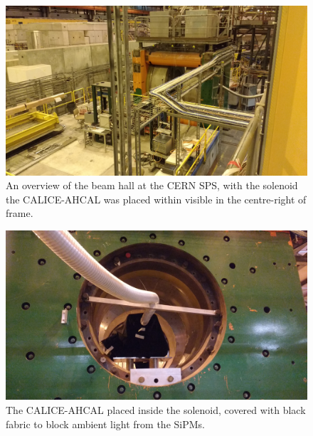 \begin{figure}[p]
	\centering
	\includegraphics[width=1\textwidth]{../Pictures/AHCAL-CERN-2017-Area-1.jpg}
	\caption{An overview of the beam hall at the \acrshort{CERN} \acrshort{SPS}, with the solenoid the \acrshort{CALICE}-\acrshort{AHCAL} was placed within visible in the centre-right of frame.}
	\label{figure:aida/may2017/area-1}
\end{figure}

\begin{figure}[p]
	\centering
	\includegraphics[width=1\textwidth]{../Pictures/AHCAL-CERN-2017-Area-2.jpg}
	\caption{The \acrshort{CALICE}-\acrshort{AHCAL} placed inside the solenoid, covered with black fabric to block ambient light from the \acrshort{SiPM}s.}
	\label{figure:aida/may2017/area-2}
\end{figure}

